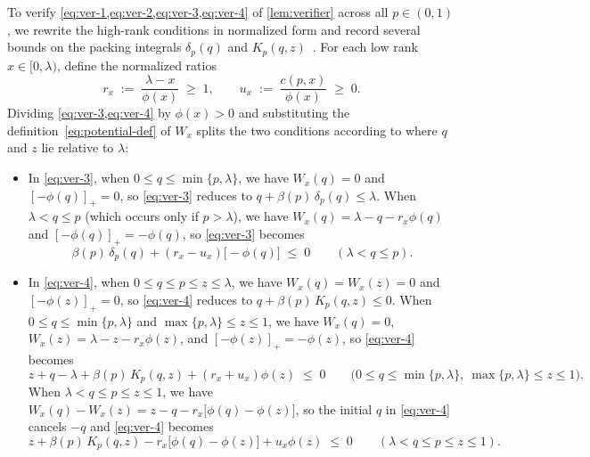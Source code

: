 \documentclass[11pt]{article}
\numberwithin{equation}{section}
\theoremstyle{plain}
\theoremstyle{definition}
\newcommand{\1}{\mathbf{1}}
\begin{document}
To verify \cref{eq:ver-1,eq:ver-2,eq:ver-3,eq:ver-4} of \cref{lem:verifier} across all $p \in (0, 1)$, we rewrite the high-rank conditions in normalized form and record several bounds on the packing integrals $\delta_p(q)$ and $K_p(q, z)$~\cite{CaiEtAl26b}. For each low rank $x \in [0, \lambda)$, define the normalized ratios
\[
  r_x \;:=\; \frac{\lambda - x}{\phi(x)} \;\ge\; 1,
  \qquad
  u_x \;:=\; \frac{c(p, x)}{\phi(x)} \;\ge\; 0.
\]
Dividing \cref{eq:ver-3,eq:ver-4} by $\phi(x) > 0$ and substituting the definition~\eqref{eq:potential-def} of $W_x$ splits the two conditions according to where $q$ and $z$ lie relative to $\lambda$:
\begin{itemize}
  \item In \cref{eq:ver-3}, when $0 \le q \le \min\{p, \lambda\}$, we have $W_x(q) = 0$ and $[-\phi(q)]_+ = 0$, so \cref{eq:ver-3} reduces to $q + \beta(p)\,\delta_p(q) \le \lambda$. When $\lambda < q \le p$ (which occurs only if $p > \lambda$), we have $W_x(q) = \lambda - q - r_x\phi(q)$ and $[-\phi(q)]_+ = -\phi(q)$, so \cref{eq:ver-3} becomes
  \begin{equation}
    \beta(p)\,\delta_p(q) + (r_x - u_x)\bigl[-\phi(q)\bigr] \;\le\; 0
    \qquad (\lambda < q \le p).
    \label{eq:ver-3-norm}
  \end{equation}
  \item In \cref{eq:ver-4}, when $0 \le q \le p \le z \le \lambda$, we have $W_x(q) = W_x(z) = 0$ and $[-\phi(z)]_+ = 0$, so \cref{eq:ver-4} reduces to $q + \beta(p)\,K_p(q, z) \le 0$. When $0 \le q \le \min\{p, \lambda\}$ and $\max\{p, \lambda\} \le z \le 1$, we have $W_x(q) = 0$, $W_x(z) = \lambda - z - r_x\phi(z)$, and $[-\phi(z)]_+ = -\phi(z)$, so \cref{eq:ver-4} becomes
  \begin{equation}
    z + q - \lambda + \beta(p)\,K_p(q, z) + (r_x + u_x)\phi(z) \;\le\; 0
    \qquad \bigl(0 \le q \le \min\{p, \lambda\},\ \max\{p, \lambda\} \le z \le 1\bigr).
    \label{eq:ver-4-lowq}
  \end{equation}
  When $\lambda < q \le p \le z \le 1$, we have $W_x(q) - W_x(z) = z - q - r_x\bigl[\phi(q) - \phi(z)\bigr]$, so the initial $q$ in \cref{eq:ver-4} cancels $-q$ and \cref{eq:ver-4} becomes
  \begin{equation}
    z + \beta(p)\,K_p(q, z) - r_x\bigl[\phi(q) - \phi(z)\bigr] + u_x\phi(z) \;\le\; 0
    \qquad (\lambda < q \le p \le z \le 1).
    \label{eq:ver-4-highq}
  \end{equation}
\end{itemize}
\end{document}
